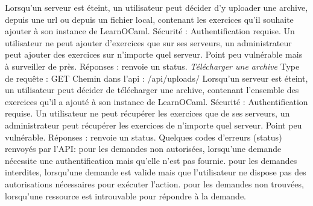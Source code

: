 \documentclass{article}
\begin{document}
\newline
Lorsqu'un serveur est éteint, un utilisateur peut décider d'y uploader une archive, depuis une url ou depuis un fichier local, contenant les exercices qu'il souhaite ajouter à son instance de LearnOCaml.
\newline
Sécurité : Authentification requise. Un utilisateur ne peut ajouter d'exercices que sur ses serveurs, un administrateur peut ajouter des exercices sur n'importe quel serveur. Point peu vulnérable mais à surveiller de près.
\newline
Réponses : renvoie un status.
\newline
\newline
\textit{Télécharger une archive}
\newline
Type de requête : GET
\newline
Chemin dans l'api : /api/uploads/
\newline
Lorsqu'un serveur est éteint, un utilisateur peut décider de télécharger une archive, contenant l'ensemble des exercices qu'il a ajouté à son instance de LearnOCaml.
\newline
Sécurité : Authentification requise. Un utilisateur ne peut récupérer les exercices que de ses serveurs, un administrateur peut récupérer les exercices de n'importe quel serveur. Point peu vulnérable.
\newline
Réponses : renvoie un status.
\newline
\newline
Quelques codes d'erreurs (status) renvoyés par l'API:
 pour les demandes non autorisées, lorsqu'une demande nécessite une authentification mais qu'elle n'est pas fournie.
 pour les demandes interdites, lorsqu'une demande est valide mais que l'utilisateur ne dispose pas des autorisations nécessaires pour exécuter l'action.
 pour les demandes non trouvées, lorsqu'une ressource est introuvable pour répondre à la demande.

\newpage
\end{document}

